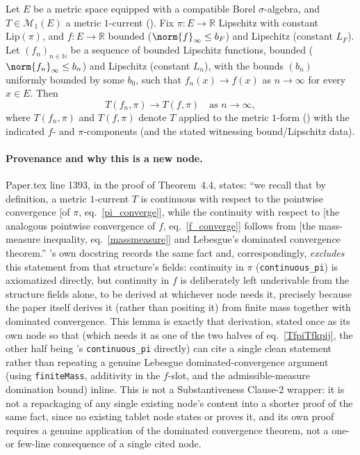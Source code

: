 \begin{lemma}\label{CurrentContinuousF}
  Let $E$ be a metric space equipped with a compatible Borel $\sigma$-algebra, and $T \in
  \mathcal{M}_1(E)$ a metric $1$-current (). Fix $\pi \colon E \to
  \mathbb{R}$ Lipschitz with constant $\mathrm{Lip}(\pi)$, and $f \colon E \to \mathbb{R}$ bounded
  ($\norm{f}_\infty \le b_F$) and Lipschitz (constant $L_F$). Let $(f_n)_{n \in \mathbb{N}}$ be a
  sequence of bounded Lipschitz functions, bounded ($\norm{f_n}_\infty \le b_n$) and Lipschitz
  (constant $L_n$), with the bounds $(b_n)$ uniformly bounded by some $b_0$, such that
  $f_n(x) \to f(x)$ as $n\to\infty$ for every $x \in E$. Then
  \[
    T(f_n,\pi) \to T(f,\pi) \quad \text{as } n \to \infty
    ,
  \]
  where $T(f_n,\pi)$ and $T(f,\pi)$ denote $T$ applied to the metric $1$-form ()
  with the indicated $f$- and $\pi$-components (and the stated witnessing bound/Lipschitz data).

  \paragraph{Provenance and why this is a new node.} Paper.tex line 1393, in the proof of
  Theorem~4.4, states: ``we recall that by definition, a metric $1$-current $T$ is continuous with
  respect to the pointwise convergence [of $\pi$, eq.~\eqref{pi_converge}], while the continuity
  with respect to [the analogous pointwise convergence of $f$, eq.~\eqref{f_converge}] follows from
  [the mass-measure inequality, eq.~\eqref{massmeasure}] and Lebesgue's dominated convergence
  theorem.'' 's own docstring records the same fact and, correspondingly,
  \emph{excludes} this statement from that structure's fields: continuity in $\pi$
  (\texttt{continuous\_pi}) is axiomatized directly, but continuity in $f$ is deliberately left
  underivable from the structure fields alone, to be derived at whichever node needs it, precisely
  because the paper itself derives it (rather than positing it) from finite mass together with
  dominated convergence. This lemma is exactly that derivation, stated once as its own node so
  that  (which needs it as one of the two halves of
  eq.~\eqref{TfpiTfkpij}, the other half being 's \texttt{continuous\_pi}
  directly) can cite a single clean statement rather than repeating a genuine Lebesgue
  dominated-convergence argument (using \texttt{finiteMass}, additivity in the $f$-slot, and the
  admissible-measure domination bound) inline. This is not a Substantiveness Clause-2 wrapper: it
  is not a repackaging of any single existing node's content into a shorter proof of the same fact,
  since no existing tablet node states or proves it, and its own proof requires a genuine
  application of the dominated convergence theorem, not a one- or few-line consequence of a single
  cited node.
\end{lemma}
